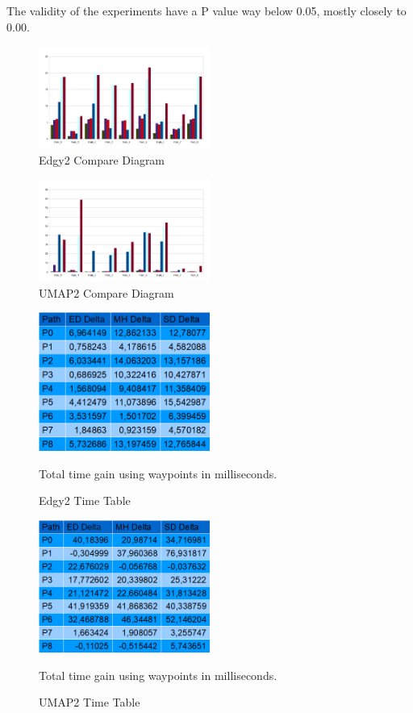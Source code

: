 \documentclass[a4paper]{article}
\begin{document}
The validity of the experiments have a P value way below 0.05, mostly closely to 0.00.
\begin{figure}[h!]
\centering
\includegraphics[width=0.5\textwidth,height=\textheight,keepaspectratio]{ChartsAndFigures/Edgy2_d2.png}
\caption{Edgy2 Compare Diagram}
\label{fig:Edgy2_d2}
\end{figure}
\begin{figure}[h!]
\centering
\includegraphics[width=0.5\textwidth,height=\textheight,keepaspectratio]{ChartsAndFigures/UMAP2_d2.png}
\caption{UMAP2 Compare Diagram}
\label{fig:UMAP2_d2}
\end{figure}
\begin{figure}[h!]
\centering
\includegraphics[width=0.5\textwidth,height=\textheight,keepaspectratio]{ChartsAndFigures/Edgy2_timeTable.png}
\caption{Edgy2 Time Table}
Total time gain using waypoints in milliseconds.
\label{fig:Edgy2_cd}
\end{figure}
\begin{figure}[h!]
\centering
\includegraphics[width=0.5\textwidth,height=\textheight,keepaspectratio]{ChartsAndFigures/UMAP2_timeTable.png}
\caption{UMAP2 Time Table}
Total time gain using waypoints in milliseconds.
\label{fig:UMAP2_cd}
\end{figure}
\end{document}

